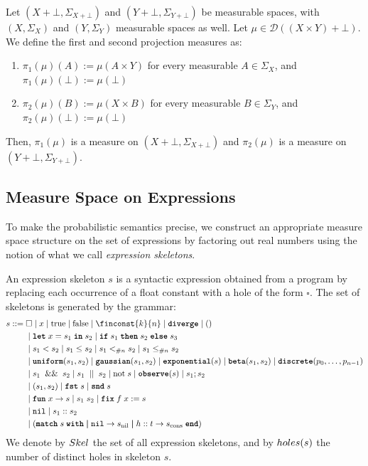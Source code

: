 \begin{definition}
	Let $(X + \bot, \Sigma_{X + \bot})$ and $(Y + \bot, \Sigma_{Y + \bot})$ be measurable spaces, with $(X, \Sigma_X)$ and $(Y, \Sigma_Y)$ measurable spaces as well. Let $\mu \in \mathcal{D}((X \times Y) + \bot)$. We define the first and second projection measures as:
	\begin{enumerate}
	\item $\pi_1(\mu)(A) := \mu(A \times Y)$ for every measurable $A \in \Sigma_X$, and $\pi_1(\mu)({\bot}) := \mu({\bot})$
	\item $\pi_2(\mu)(B) := \mu(X \times B)$ for every measurable $B \in \Sigma_Y$, and $\pi_2(\mu)({\bot}) := \mu({\bot})$
	\end{enumerate}
	Then, $\pi_1(\mu)$ is a measure on $(X + \bot, \Sigma_{X + \bot})$ and $\pi_2(\mu)$ is a measure on $(Y + \bot, \Sigma_{Y + \bot})$.
\end{definition}


\subsection{Measure Space on Expressions}
\label{app:measure_space_expressions}
To make the probabilistic semantics precise, we construct an appropriate measure space structure on the set of expressions by factoring out real numbers using the notion of what we call \emph{expression skeletons}.

\begin{definition}
	An expression skeleton $s$ is a syntactic expression obtained from a program by replacing each occurrence of a float constant with a hole of the form $\square$. The set of skeletons is generated by the grammar:
	\begin{align*}
		s ::= \; 
		&\square \mid x \mid \true \mid \false \mid \finconst{k}{n} \mid \diverge \mid () \\
		&\mid \letkw \; x = s_1 \; \inkw \; s_2 \mid \ifkw \; s_1 \; \thenkw \; s_2 \; \elsekw \; s_3 \\
		&\mid s_1 < s_2 \mid s_1 \leq s_2 \mid s_1 \finlt{n} s_2 \mid s_1 \finleq{n} s_2 \\
		&\mid \uniform(s_1, s_2) \mid \gaussian(s_1, s_2) \mid \exponential(s) \mid \betafn(s_1, s_2) \mid \discrete(p_0, \ldots, p_{n-1}) \\
		&\mid s_1\; \logand\; s_2 \mid s_1\; \logor\; s_2 \mid \lognot\; s \mid \observekw(s) \mid s_1; s_2 \\
		&\mid (s_1, s_2) \mid \fstkw \; s \mid \sndkw \; s \\
		&\mid \funkw \; x \to s \mid s_1 \; s_2 \mid \fixkw\; f\; x := s \\
		&\mid \textnormal{\ttfamily nil} \mid s_1 :: s_2 \\
		&\mid (\matchkw \; s \; \withkw \matchcase \textnormal{\ttfamily nil} \rightarrow s_{\textnormal{nil}} \matchcase h::t \rightarrow s_{\textnormal{cons}} \; {\textnormal{\ttfamily\bfseries end}})
	\end{align*}
	We denote by $Skel$ the set of all expression skeletons, and by $holes(s)$ the number of distinct holes in skeleton $s$.
\end{definition}


